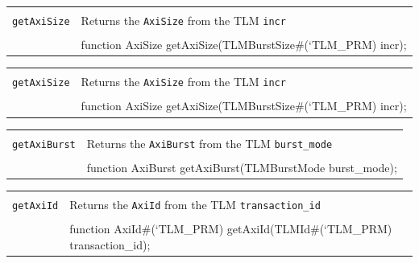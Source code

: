\documentclass[twoside,letterpaper]{article}
\newcommand{\te}[1]{\texttt{#1}}
\newenvironment{libverbatim}
  {\vspace*{-1.0em}
   \verbatim}
  {\endverbatim
  }
\begin{document}
\begin{center}
\begin{tabular}{|p{1.2 in}|p{5 in}|}
\hline 
&\\
\te{getAxiSize}&Returns the \te{AxiSize} from the TLM \te{incr}   \\
&\\
\cline{2-2}
&\begin{libverbatim}
function AxiSize getAxiSize(TLMBurstSize#(`TLM_PRM) incr);
\end{libverbatim}
\\
\hline
\end{tabular}
\end{center}


\begin{center}
\begin{tabular}{|p{1.2 in}|p{5 in}|}
\hline 
&\\
\te{getAxiSize}&Returns the \te{AxiSize} from the TLM \te{incr}   \\
&\\
\cline{2-2}
&\begin{libverbatim}
function AxiSize getAxiSize(TLMBurstSize#(`TLM_PRM) incr);
\end{libverbatim}
\\
\hline
\end{tabular}
\end{center}



\begin{center}
\begin{tabular}{|p{1.2 in}|p{5 in}|}
\hline 
&\\
\te{getAxiBurst}& Returns the \te{AxiBurst} from the TLM \te{burst\_mode}  \\
&\\
\cline{2-2}
&\begin{libverbatim}
function AxiBurst getAxiBurst(TLMBurstMode burst_mode);
\end{libverbatim}
\\
\hline
\end{tabular}
\end{center}


\begin{center}
\begin{tabular}{|p{1.2 in}|p{5 in}|}
\hline 
&\\
\te{getAxiId}&Returns the \te{AxiId} from the TLM \te{transaction\_id}   \\
&\\
\cline{2-2}
&\begin{libverbatim}
function AxiId#(`TLM_PRM) getAxiId(TLMId#(`TLM_PRM) transaction_id);
\end{libverbatim}
\\
\hline
\end{tabular}
\end{center}
\end{document}
